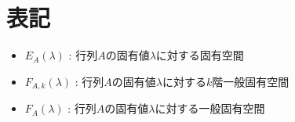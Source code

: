 \chapter{表記}
    \begin{itemize}
        \item $E_A(\lambda)$ : 行列$A$の固有値$\lambda$に対する固有空間
        \item $F_{A,k}(\lambda)$ : 行列$A$の固有値$\lambda$に対する$k$階一般固有空間
        \item $F_A(\lambda)$ : 行列$A$の固有値$\lambda$に対する一般固有空間
    \end{itemize}